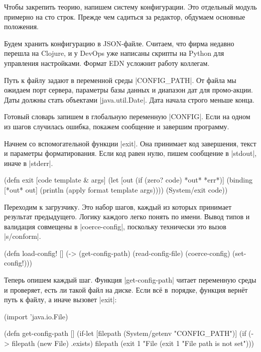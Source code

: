 Чтобы закрепить теорию, напишем систему конфигурации. Это отдельный модуль
примерно на сто строк. Прежде чем садиться за редактор, обдумаем основные
положения.

Будем хранить конфигурацию в JSON-файле. Считаем, что фирма недавно перешла на
Clojure, и у DevOps уже написаны скрипты на Python для управления
настройками. Формат EDN усложнит работу коллегам.

Путь к файлу задают в переменной среды \spverb|CONFIG_PATH|. От файла мы ожидаем
порт сервера, параметры базы данных и диапазон дат для промо-акции. Даты должны
стать объектами \spverb|java.util.Date|. Дата начала строго меньше конца.

Готовый словарь запишем в глобальную переменную \spverb|CONFIG|. Если на одном
из шагов случилась ошибка, покажем сообщение и завершим программу.

Начнем со вспомогательной функции \spverb|exit|. Она принимает код завершения,
текст и параметры форматирования. Если код равен нулю, пишем сообщение в
\spverb|stdout|, иначе в \spverb|stderr|.

\begin{english}
  \begin{clojure}
(defn exit
  [code template & args]
  (let [out (if (zero? code) *out* *err*)]
    (binding [*out* out]
      (println (apply format template args))))
  (System/exit code))
  \end{clojure}
\end{english}

Переходим к загрузчику. Это набор шагов, каждый из которых принимает результат
предыдущего. Логику каждого легко понять по имени. Вывод типов и валидация
совмещены в \spverb|coerce-config|, поскольку технически это вызов
\spverb|s/conform|.

\begin{english}
  \begin{clojure}
(defn load-config! []
  (-> (get-config-path)
      (read-config-file)
      (coerce-config)
      (set-config!)))
  \end{clojure}
\end{english}

Теперь опишем каждый шаг. Функция \spverb|get-config-path| читает переменную
среды и проверяет, есть ли такой файл на диске. Если вс\"{е} в~порядке, функция
верн\"{е}т путь к файлу, а иначе вызовет \spverb|exit|:

\begin{english}
  \begin{clojure}
(import 'java.io.File)

(defn get-config-path []
  (if-let [filepath (System/getenv "CONFIG_PATH")]
    (if (-> filepath (new File) .exists)
      filepath
      (exit 1 "File %
    (exit 1 "File path is not set")))
  \end{clojure}
\end{english}

